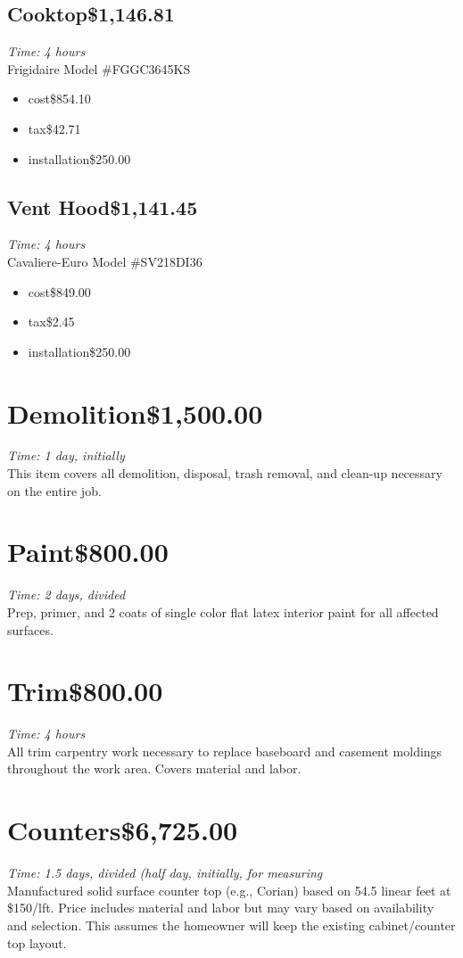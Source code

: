\documentclass[letterpaper,10pt]{article}
\begin{document}
\subsection{Cooktop\dotfill\$1,146.81}
\emph{Time: 4 hours} \\
Frigidaire Model \#FGGC3645KS
	\begin{itemize}
		\item cost\dotfill\$854.10
		\item tax\dotfill\$42.71
		\item installation\dotfill\$250.00
	\end{itemize}
\subsection{Vent Hood\dotfill\$1,141.45}
\emph{Time: 4 hours} \\
Cavaliere-Euro Model \#SV218DI36
	\begin{itemize}
		\item cost\dotfill\$849.00
		\item tax\dotfill\$2.45
		\item installation\dotfill\$250.00
	\end{itemize}

\section{Demolition\dotfill\$1,500.00}
\emph{Time: 1 day, initially} \\
This item covers all demolition, disposal, trash removal, and clean-up necessary on the entire job.

\section{Paint\dotfill\$800.00}
\emph{Time: 2 days, divided} \\
Prep, primer, and 2 coats of single color flat latex interior paint for all affected surfaces.

\section{Trim\dotfill\$800.00}
\emph{Time: 4 hours} \\
All trim carpentry work necessary to replace baseboard and casement moldings throughout the work area.  Covers material and labor.

\section{Counters\dotfill\$6,725.00}
\emph{Time: 1.5 days, divided (half day, initially, for measuring} \\
Manufactured solid surface counter top (e.g., Corian) based on 54.5 linear feet at \$150/lft.  Price includes material and labor but may vary based on availability and selection.  This assumes the homeowner will keep the existing cabinet/counter top layout.
\end{document}
